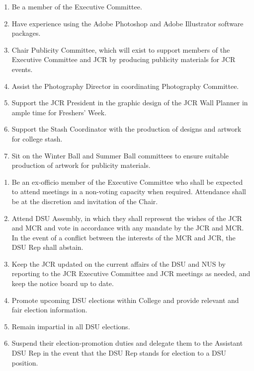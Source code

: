 \begin{enumerate}
    \item Be a member of the Executive Committee.
    \item Have experience using the Adobe Photoshop and Adobe Illustrator software packages.
    \item Chair Publicity Committee, which will exist to support members of the Executive Committee and JCR by producing publicity materials for JCR events.
    \item Assist the Photography Director in coordinating Photography Committee.
    \item Support the JCR President in the graphic design of the JCR Wall Planner in ample time for Freshers’ Week.
    \item Support the Stash Coordinator with the production of designs and artwork for college stash.
    \item Sit on the Winter Ball and Summer Ball committees to ensure suitable production of artwork for publicity materials.
\end{enumerate}


\begin{enumerate}
    \item Be an ex-officio member of the Executive Committee who shall be expected to attend meetings in a non-voting capacity when required. Attendance shall be at the discretion and invitation of the Chair. 
    \item Attend DSU Assembly, in which they shall represent the wishes of the JCR and MCR and vote in accordance with any mandate by the JCR and MCR. In the event of a conflict between the interests of the MCR and JCR, the DSU Rep shall abstain.
    \item Keep the JCR updated on the current affairs of the DSU and NUS by reporting to the JCR Executive Committee and JCR meetings as needed, and keep the notice board up to date.
    \item Promote upcoming DSU elections within College and provide relevant and fair election information.
    \item Remain impartial in all DSU elections.
    \item Suspend their election-promotion duties and delegate them to the Assistant DSU Rep in the event that the DSU Rep stands for election to a DSU position.
\end{enumerate}

